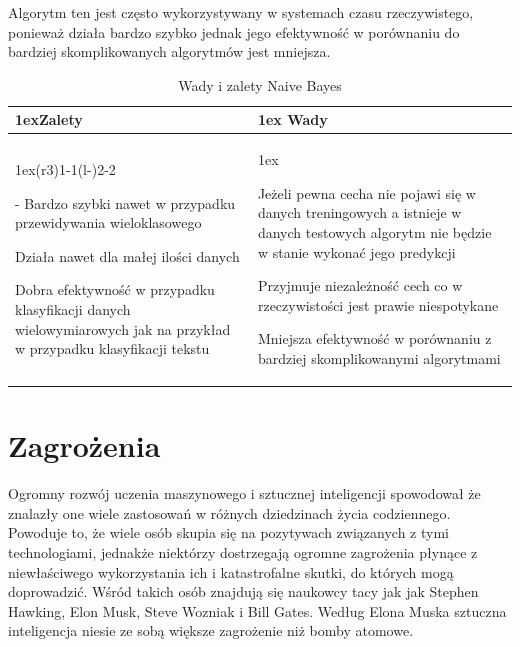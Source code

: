 Algorytm ten jest często wykorzystywany w systemach czasu rzeczywistego, ponieważ działa bardzo szybko jednak
jego efektywność w porównaniu do bardziej skomplikowanych algorytmów jest mniejsza.
\begin{table}[h]
    \begin{tabularx}{\linewidth}{>{\parskip1ex}X@{\kern4\tabcolsep}>{\parskip1ex}X}
    \toprule
    \hfil\bfseries Zalety
    &
    \hfil\bfseries Wady
    \\\cmidrule(r{3\tabcolsep}){1-1}\cmidrule(l{-\tabcolsep}){2-2}
    
    - Bardzo szybki nawet w przypadku przewidywania wieloklasowego\par
    Działa nawet dla małej ilości danych\par
    Dobra efektywność w przypadku klasyfikacji danych wielowymiarowych
    jak na przykład w przypadku klasyfikacji tekstu\par
    
    &
    
    Jeżeli pewna cecha nie pojawi się w danych treningowych a istnieje w danych 
    testowych algorytm nie będzie w stanie wykonać jego predykcji\par
    Przyjmuje niezależność cech co w rzeczywistości jest prawie niespotykane\par
    Mniejsza efektywność w porównaniu z bardziej skomplikowanymi algorytmami\par
    
    \\\bottomrule
    \end{tabularx}
    \caption{Wady i zalety Naive Bayes}
\end{table}

\section{Zagrożenia}
Ogromny rozwój uczenia maszynowego i sztucznej inteligencji spowodował że znalazły one 
wiele zastosowań w różnych dziedzinach życia codziennego. Powoduje to, że wiele osób skupia się 
na pozytywach związanych
z tymi technologiami, jednakże niektórzy dostrzegają ogromne zagrożenia płynące z niewłaściwego 
wykorzystania ich i katastrofalne skutki, do których mogą doprowadzić. 
Wśród takich osób znajdują się naukowcy tacy jak jak Stephen Hawking, Elon Musk, Steve Wozniak i Bill Gates. 
Według Elona Muska sztuczna inteligencja niesie ze sobą większe zagrożenie niż bomby atomowe. 

